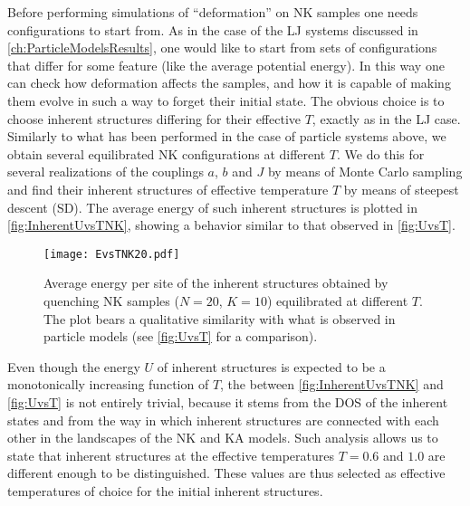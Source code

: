 Before performing simulations of ``deformation'' on NK samples one needs configurations to start from.
As in the case of the LJ systems discussed in \autoref{ch:ParticleModelsResults}, one would like to start from sets of configurations that differ for some feature (like the average potential energy). In this way one can check how deformation affects the samples, and how it is capable of making them evolve in such a way to forget their initial state. The obvious choice is to choose inherent structures differing for their effective $T$, exactly as in the LJ case.
Similarly to what has been performed in the case of particle systems above, we obtain several equilibrated NK configurations at different $T$. We do this for several realizations of the couplings $a$, $b$ and $J$ by means of Monte Carlo sampling and find their inherent structures of effective temperature $T$ by means of steepest descent (SD). The average energy of such inherent structures is plotted in \autoref{fig:InherentUvsTNK}, showing a behavior similar to that observed in \autoref{fig:UvsT}.
\begin{figure}[!h] 
\centering 
\texttt{[image: EvsTNK20.pdf]} 
\caption{Average energy per site of the inherent structures obtained by quenching NK samples ($N = 20$, $K=10$) equilibrated at different $T$. The plot bears a qualitative similarity with what is observed in particle models (see \autoref{fig:UvsT} for a comparison).\label{fig:InherentUvsTNK}}
\end{figure}
Even though the energy $U$ of inherent structures is expected to be a monotonically increasing function of $T$, the between \autoref{fig:InherentUvsTNK} and \autoref{fig:UvsT} is not entirely trivial, because it stems from the DOS of the inherent states and from the way in which inherent structures are connected with each other in the landscapes of the NK and KA models. Such analysis allows us to state that inherent structures at the effective temperatures $T = 0.6$ and $1.0$ are different enough to be distinguished. These values are thus selected as effective temperatures of choice for the initial inherent structures.

